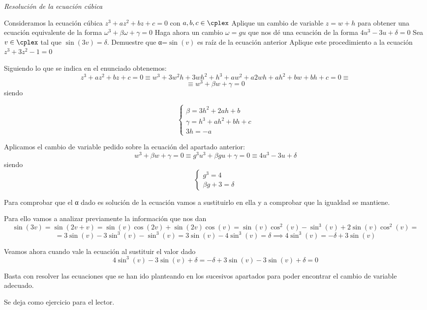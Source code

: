 \begin{problem}[2]
\textit{Resolución de la ecuación cúbica}

Consideramos la ecuación cúbica $z^3+az^2+bz+c=0$ con $a,b,c \in \cplex$
\ppart Aplique un cambio de variable $z=w+h$ para obtener una ecuación equivalente de la forma $ω^3+βω+γ=0$
\ppart Haga ahora un cambio $ω=gu$ que nos dé una ecuación de la forma $4u^3-3u+δ=0$
\ppart Sea $v \in \cplex$ tal que $\sin(3v)=δ$. Demuestre que α=$\sin(v)$ es raíz de la ecuación anterior
\ppart Aplique este procedimiento a la ecuación $z^3+3z^2-1=0$

\solution


\spart
Siguiendo lo que se indica en el enunciado obtenemos:
\[z^3+az^2+bz+c = 0 \equiv w^3+3w^2h+3wh^2+h^3 + aw^2+a2wh+ah^2+bw+bh+c =0 \equiv\]
\[\equiv w^3+βw+γ = 0\]
siendo

\[\left\{ \begin{array}{l}
             β = 3h^2+2ah+b \\
			 γ = h^3+ah^2+bh+c \\
			 3h = -a
             \end{array}
\right.\]

\spart

Aplicamos el cambio de variable pedido sobre la ecuación del apartado anterior:
\[w^3+βw+γ=0 \equiv g^3u^3+βgu+γ = 0 \equiv 4u^3-3u+δ\]
siendo
\[\left\{ \begin{array}{l}
             g^3 = 4 \\
			 βg + 3 = δ
             \end{array}
\right.\]

\spart

Para comprobar que el α dado es solución de la ecuación vamos a sustituirlo en ella y a comprobar que la igualdad se mantiene.

Para ello vamos a analizar previamente la información que nos dan
\[\sin(3v) = \sin(2v+v)=\sin(v)\cos(2v)+\sin(2v)\cos(v) = \sin(v)\cos^2(v)-\sin^3(v)+2\sin(v)\cos^2(v) = \]
\[=3\sin(v)-3\sin^3(v)-\sin^3(v) = 3\sin(v)-4\sin^3(v)=δ \implies 4\sin^3(v)=-δ+3\sin(v)\]

Veamos ahora cuando vale la ecuación al sustituir el valor dado
\[4\sin^3(v)-3 \sin(v) +δ = -δ+3\sin(v)-3\sin(v) +δ = 0\]

\spart

Basta con resolver las ecuaciones que se han ido planteando en los sucesivos apartados para poder encontrar el cambio de variable adecuado.

Se deja como ejercicio para el lector.
\end{problem}

